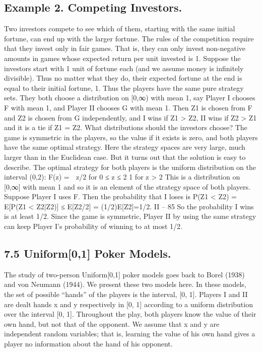 \documentclass[]{report}
\begin{document}
\subsection{Example 2. Competing Investors.} Two investors compete to see which of them,
starting with the same initial fortune, can end up with the larger fortune. The rules of
the competition require that they invest only in fair games. That is, they can only invest
non-negative amounts in games whose expected return per unit invested is 1.
Suppose the investors start with 1 unit of fortune each (and we assume money is
infinitely divisible). Thus no matter what they do, their expected fortune at the end is
equal to their initial fortune, 1.
Thus the players have the same pure strategy sets. They both choose a distribution
on [0,∞) with mean 1, say Player I chooses F with mean 1, and Player II chooses G with
mean 1. Then Z1 is chosen from F and Z2 is chosen from G independently, and I wins
if Z1 > Z2, II wins if Z2 > Z1 and it is a tie if Z1 = Z2. What distributions should the
investors choose?
The game is symmetric in the players, so the value if it exists is zero, and both players
have the same optimal strategy. Here the strategy spaces are very large, much larger than
in the Euclidean case. But it turns out that the solution is easy to describe. The optimal
strategy for both players is the uniform distribution on the interval (0,2):
F(z) =  z/2 for 0 ≤ z ≤ 2
1 for z > 2
This is a distribution on [0,∞] with mean 1 and so it is an element of the strategy space
of both players. Suppose Player I uses F. Then the probability that I loses is
P(Z1 < Z2) = E[P(Z1 < Z2|Z2)] ≤ E[Z2/2] = (1/2)E[Z2]=1/2.
II – 85
So the probability I wins is at least 1/2. Since the game is symmetric, Player II by using
the same strategy can keep Player I’s probability of winning to at most 1/2.

\subsection{7.5 Uniform[0,1] Poker Models.} The study of two-person Uniform[0,1] poker
models goes back to Borel (1938) and von Neumann (1944). We present these two models
here. In these models, the set of possible “hands” of the players is the interval, [0, 1].
Players I and II are dealt hands x and y respectively in [0, 1] according to a uniform
distribution over the interval [0, 1]. Throughout the play, both players know the value of
their own hand, but not that of the opponent. We assume that x and y are independent
random variables; that is, learning the value of his own hand gives a player no information
about the hand of his opponent.
\end{document}
